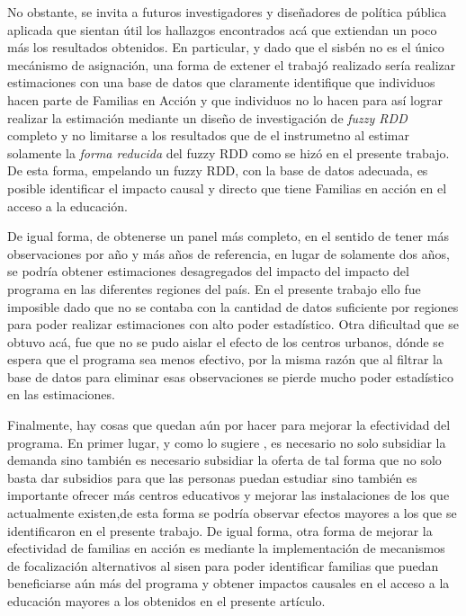 \documentclass[AER]{AEA}
\begin{document}

No obstante, se invita a futuros investigadores y diseñadores de política pública aplicada que sientan útil los hallazgos encontrados acá que extiendan un poco más los resultados obtenidos. En particular, y dado que el sisbén no es el único mecánismo de asignación, una forma de extener el trabajó realizado sería realizar estimaciones con una base de datos que claramente identifique que individuos hacen parte de Familias en Acción y que individuos no lo hacen para así lograr realizar la estimación mediante un diseño de investigación de \textit{fuzzy RDD} completo y no limitarse a los resultados que de el instrumetno al estimar solamente la \textit{forma reducida} del fuzzy RDD como se hizó en el presente trabajo. De esta forma, empelando un fuzzy RDD, con la base de datos adecuada, es posible identificar el impacto causal y directo que tiene Familias en acción en el acceso a la educación. 

De igual forma, de obtenerse un panel más completo, en el sentido de tener más observaciones por año y más años de referencia, en lugar de solamente dos años, se podría obtener estimaciones desagregados del impacto del impacto del programa en las diferentes regiones del país. En el presente trabajo ello fue imposible dado que no se contaba con la cantidad de datos suficiente por regiones para poder realizar estimaciones con alto poder estadístico. Otra dificultad que se obtuvo acá, fue que no se pudo aislar el efecto de los centros urbanos, dónde se espera que el programa sea menos efectivo, por la misma razón que al filtrar la base de datos para eliminar esas observaciones se pierde mucho poder estadístico en las estimaciones.



Finalmente, hay cosas que quedan aún por hacer para mejorar la efectividad del programa. En primer lugar, y como lo sugiere \cite{Robles2018Las2001-2018}, es necesario no solo subsidiar la demanda sino también es necesario subsidiar la oferta de tal forma que no solo basta dar subsidios para que las personas puedan estudiar sino también es importante ofrecer más centros educativos y mejorar las instalaciones de los que actualmente existen,de esta forma se podría observar efectos mayores a los que se identificaron en el presente trabajo. De igual forma, otra forma de mejorar la efectividad de familias en acción es mediante la implementación de mecanismos de focalización alternativos al sisen para poder identificar familias que puedan beneficiarse aún más del programa y obtener impactos causales en el acceso a la educación mayores a los obtenidos en el presente artículo.
\end{document}
